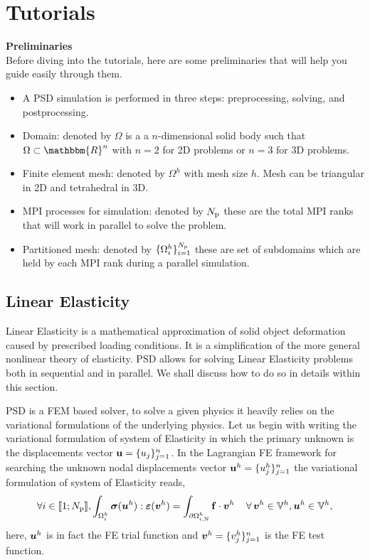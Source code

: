 \chapter{Tutorials}

\textbf{Preliminaries}\\
Before diving into the tutorials, here are some preliminaries that will help you guide easily through them.

\begin{itemize}
    \item A PSD simulation is performed in three steps: preprocessing, solving, and postprocessing. 
    \item Domain: denoted by $\Omega$ is a a $n$-dimensional solid body such that $\Omega \subset \mathbbm{R}^n$ with $n=2$   for 2D problems or  $n=3$ for 3D problems.
    \item Finite element mesh: denoted by $\Omega^h$ with mesh size $h$. Mesh can be triangular in 2D and tetrahedral in 3D.
    \item MPI processes for simulation: denoted by $N_\text{p}$ these are the total MPI ranks that will work in parallel to solve the problem.
    \item Partitioned mesh: denoted by $\{ \Omega ^h_i \}_{i=1}^{N_\text{p}}$ these are set of subdomains which are held by each MPI rank during a parallel simulation.
\end{itemize}

\section{Linear Elasticity}
Linear Elasticity is a mathematical approximation of solid object deformation caused by prescribed loading conditions. It is a simplification of the more general nonlinear theory of elasticity. PSD allows for solving Linear Elasticity problems both in sequential and in parallel. We shall discuss how to do so in details within this section.


PSD is a FEM based solver, to solve a given physics it heavily relies on the variational formulations of the underlying physics. Let us begin with writing the variational formulation of system of  Elasticity in which the primary unknown is the displacements vector ${\bf{u}}=\{u_j\}^n_{j=1}$. In the Lagrangian FE framework for searching the unknown nodal displacements vector ${\bf{u}}^h=\{u^h_j\}^n_{j=1}$ the variational formulation of system of  Elasticity reads,
%
%
\begin{equation}\label{Eq:Varf}
\forall i \in \llbracket 1; N_{\text p} \rrbracket,  \int_{\Omega^h_i}\boldsymbol{\sigma}(\boldsymbol u^h) : \boldsymbol{\varepsilon}(\boldsymbol v^h) = \int_{\partial\Omega^h_{i,\text{N}}} \mathbf{f}\cdot\boldsymbol v^h \, \quad\forall\,\boldsymbol v^h\in\mathbb{V}^h,\boldsymbol u^h\in\mathbb{V}^h,
\end{equation}
%
here,  $\boldsymbol u^h$ is in fact the FE trial function and $\boldsymbol v^h=\{v^h_j\}^n_{j=1}$ is the FE test function.

